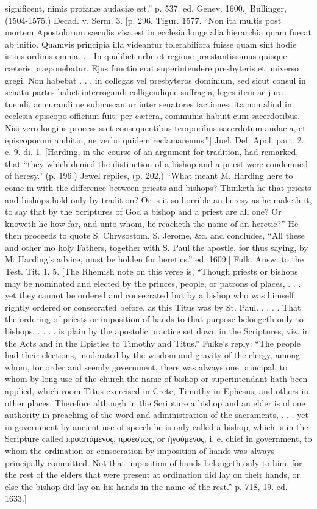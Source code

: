 significent, nimis profanæ audaciæ est.” p. 537. ed. Genev. 1600.] Bullinger, (1504-1575.) Decad. v. Serm. 3. [p. 296. Tigur. 1577. “Non ita multis post mortem Apostolorum sæculis visa est in ecclesia longe alia hierarchia quam fuerat ab initio. Quamvis principia illa videantur tolerabiliora fuisse quam sint hodie istius ordinis omnia. . . In qualibet urbe et regione præstantissimus quisque cæteris præponebatur. Ejus functio erat superintendere presbyteris et universo gregi. Non habebat . . . in collegas vel presbyteros dominium, sed sicut consul in senatu partes habet interrogandi colligendique suffragia, leges item ac jura tuendi, ac curandi ne subnascantur inter senatores factiones; ita non aliud in ecclesia episcopo officium fuit: per cætera, communia habuit cum sacerdotibus. Nisi vero longius processisset consequentibus temporibus sacerdotum audacia, et episcoporum ambitio, ne verbo quidem reclamaremus.”] Juel. Def. Apol. part. 2. c. 9. di. 1. [Harding, in the course of an argument for tradition, had remarked, that “they which denied the distinction of a bishop and a priest were condemned of heresy.” (p. 196.) Jewel replies, (p. 202,) “What meant M. Harding here to come in with the difference between priests and bishops? Thinketh he that priests and bishops hold only by tradition? Or is it so horrible an heresy as he maketh it, to say that by the Scriptures of God a bishop and a priest are all one? Or knoweth he how far, and unto whom, he reacheth the name of an heretic?” He then proceeds to quote S. Chrysostom, S. Jerome, &c. and concludes, “All these and other mo holy Fathers, together with S. Paul the apostle, for thus saying, by M. Harding’s advice, must be holden for heretics.” ed. 1609.] Fulk. Answ. to the Test. Tit. 1. 5. [The Rhemish note on this verse is, “Though priests or bishops may be nominated and elected by the princes, people, or patrons of places, . . . yet they cannot be ordered and consecrated but by a bishop who was himself rightly ordered or consecrated before, as this Titus was by St. Paul. . . . . That the ordering of priests or imposition of hands to that purpose belongeth only to bishops. . . . . is plain by the apostolic practice set down in the Scriptures, viz. in the Acts and in the Epistles to Timothy and Titus.” Fulke’s reply: “The people had their elections, moderated by the wisdom and gravity of the clergy, among whom, for order and seemly government, there was always one principal, to whom by long use of the church the name of bishop or superintendant hath been applied, which room Titus exercised in Crete, Timothy in Ephesus, and others in other places. Therefore although in the Scripture a bishop and an elder is of one authority in preaching of the word and administration of the sacraments, . . . yet in government by ancient use of speech he is only called a bishop, which is in the Scripture called προιστάμενος, προεστὼς, or ἡγούμενος, i. e. chief in government, to whom the ordination or consecration by imposition of hands was always principally committed. Not that imposition of hands belongeth only to him, for the rest of the elders that were present at ordination did lay on their hands, or else the bishop did lay on his hands in the name of the rest.” p. 718, 19. ed. 1633.]

